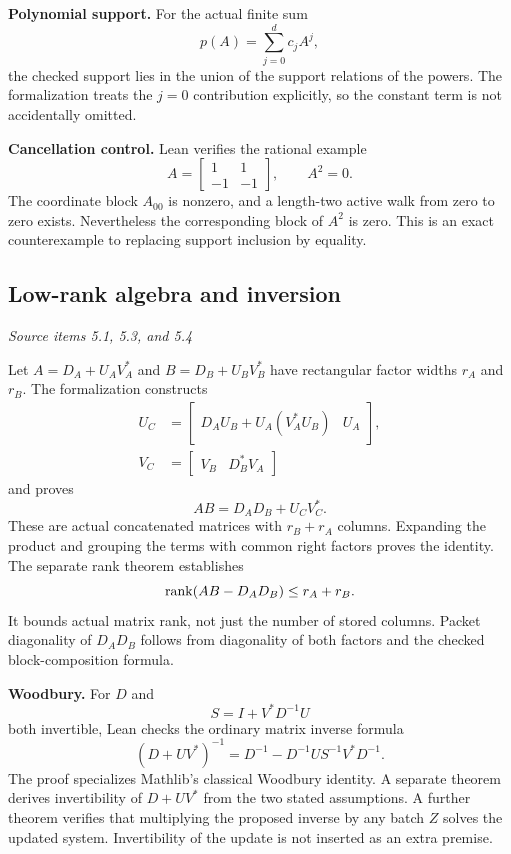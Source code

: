 \textbf{Polynomial support.} For the actual finite sum
\[
p(A)=\sum_{j=0}^{d}c_jA^j,
\]
the checked support lies in the union of the support relations of the powers. The formalization treats the $j=0$ contribution explicitly, so the constant term is not accidentally omitted.

\textbf{Cancellation control.} Lean verifies the rational example
\[
A=\begin{bmatrix}1&1\\-1&-1\end{bmatrix},\qquad A^2=0.
\]
The coordinate block $A_{00}$ is nonzero, and a length-two active walk from zero to zero exists. Nevertheless the corresponding block of $A^2$ is zero. This is an exact counterexample to replacing support inclusion by equality.



\subsection{Low-rank algebra and inversion}\label{supp1:subsection:003}\textit{Source items 5.1, 5.3, and 5.4}\par
Let $A=D_A+U_AV_A^*$ and $B=D_B+U_BV_B^*$ have rectangular factor widths $r_A$ and $r_B$. The formalization constructs
\begin{align*}
U_C&=\begin{bmatrix}D_AU_B+U_A(V_A^*U_B)&U_A\end{bmatrix},\\
V_C&=\begin{bmatrix}V_B&D_B^*V_A\end{bmatrix}
\end{align*}
and proves
\[
\boxed{AB=D_AD_B+U_CV_C^*.}
\]
These are actual concatenated matrices with $r_B+r_A$ columns. Expanding the product and grouping the terms with common right factors proves the identity. The separate rank theorem establishes
\[
\operatorname{rank}(AB-D_AD_B)\le r_A+r_B.
\]
It bounds actual matrix rank, not just the number of stored columns. Packet diagonality of $D_AD_B$ follows from diagonality of both factors and the checked block-composition formula.

\textbf{Woodbury.} For $D$ and
\[
S=I+V^*D^{-1}U
\]
both invertible, Lean checks the ordinary matrix inverse formula
\[
\boxed{(D+UV^*)^{-1}
=D^{-1}-D^{-1}US^{-1}V^*D^{-1}.}
\]
The proof specializes Mathlib's classical Woodbury identity. A separate theorem derives invertibility of $D+UV^*$ from the two stated assumptions. A further theorem verifies that multiplying the proposed inverse by any batch $Z$ solves the updated system. Invertibility of the update is not inserted as an extra premise.

